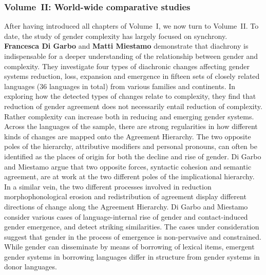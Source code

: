 \documentclass[output=collectionpaper]{langsci/langscibook}
\begin{document}
\subsubsection*{Volume~II: World-wide comparative studies}
After having introduced all chapters of Volume~I, we now turn to Volume~II.
To date, the study of gender complexity has largely focused on synchrony. \textbf{Francesca Di Garbo} and \textbf{Matti Miestamo} demonstrate that diachrony is indispensable for a deeper understanding of the relationship between gender and complexity. They investigate four types of diachronic changes affecting gender systems \textendash{} reduction, loss, expansion and emergence \textendash{} in fifteen sets of closely related languages (36 languages in total) from various families and continents. In exploring how the detected types of changes relate to complexity, they find that reduction of gender agreement does not necessarily entail reduction of complexity. Rather complexity can increase both in reducing and emerging gender systems. Across the languages of the sample, there are strong regularities in how different kinds of changes are mapped onto the Agreement Hierarchy. The two opposite poles of the hierarchy, attributive modifiers and personal pronouns, can often be identified as the places of origin for both the decline and rise of gender. Di Garbo and Miestamo argue that two opposite forces, syntactic cohesion and semantic agreement, are at work at the two different poles of the implicational hierarchy. In a similar vein, the two different processes involved in reduction \textendash{} morphophonological erosion and redistribution of agreement \textendash{} display different directions of change along the Agreement Hierarchy. Di Garbo and Miestamo consider various cases of language-internal rise of gender and contact-induced gender emergence, and detect striking similarities. The cases under consideration suggest that gender in the process of emergence is non-pervasive and constrained. While gender can disseminate by means of borrowing of lexical items, emergent gender systems in borrowing languages differ in structure from gender systems in donor languages.
\end{document}
